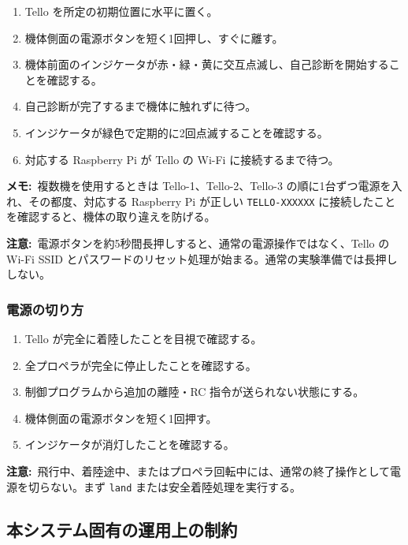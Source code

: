 \documentclass[11pt,a4paper]{ltjsarticle}
\newcommand{\code}[1]{\texttt{\small #1}}
\newcommand{\note}[1]{\par\smallskip\noindent\textbf{メモ:}~#1\par\smallskip}
\newcommand{\warning}[1]{\par\smallskip\noindent\textbf{注意:}~#1\par\smallskip}
\begin{document}
\begin{enumerate}[leftmargin=1.6em]
  \item Tello を所定の初期位置に水平に置く。
  \item 機体側面の電源ボタンを短く1回押し、すぐに離す。
  \item 機体前面のインジケータが赤・緑・黄に交互点滅し、自己診断を開始することを確認する。
  \item 自己診断が完了するまで機体に触れずに待つ。
  \item インジケータが緑色で定期的に2回点滅することを確認する。
  \item 対応する Raspberry Pi が Tello の Wi-Fi に接続するまで待つ。
\end{enumerate}

\note{複数機を使用するときは Tello-1、Tello-2、Tello-3 の順に1台ずつ電源を入れ、その都度、対応する Raspberry Pi が正しい \code{TELLO-XXXXXX} に接続したことを確認すると、機体の取り違えを防げる。}

\warning{電源ボタンを約5秒間長押しすると、通常の電源操作ではなく、Tello の Wi-Fi SSID とパスワードのリセット処理が始まる。通常の実験準備では長押ししない。}

\subsubsection{電源の切り方}

\begin{enumerate}[leftmargin=1.6em]
  \item Tello が完全に着陸したことを目視で確認する。
  \item 全プロペラが完全に停止したことを確認する。
  \item 制御プログラムから追加の離陸・RC 指令が送られない状態にする。
  \item 機体側面の電源ボタンを短く1回押す。
  \item インジケータが消灯したことを確認する。
\end{enumerate}

\warning{飛行中、着陸途中、またはプロペラ回転中には、通常の終了操作として電源を切らない。まず \code{land} または安全着陸処理を実行する。}

\subsection{本システム固有の運用上の制約}
\end{document}

